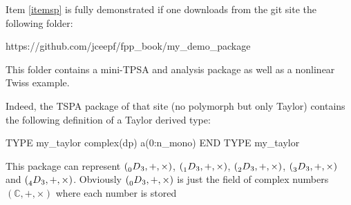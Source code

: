 \documentclass{hitec}     %
\begin{document}
Item \ref{itemsp} is fully demonstrated if one downloads from the git site the following folder:
\begin{code}
https://github.com/jceepf/fpp_book/my_demo_package
\end{code}
This folder contains a mini-TPSA and analysis package as well as a nonlinear Twiss example.


Indeed, the TSPA package of that site (no polymorph but only Taylor) contains the following definition of a Taylor derived type:


\begin{code}
 TYPE my_taylor             
    complex(dp) a(0:n_mono)    
END TYPE my_taylor
\end{code}

This package can represent  $(\prescript{}{0}{D}_{3},+,\times )$, $(\prescript{}{1}{D}_{3},+,\times )$, $(\prescript{}{2}{D}_{3},+,\times )$, $(\prescript{}{3}{D}_{3},+,\times )$ and $(\prescript{}{4}{D}_{3},+,\times )$. Obviously $(\prescript{}{0}{D}_{3},+,\times )$ is just the field of complex numbers $({\mathbb{C}},+,\times )$ where each number is stored \vn{my_taylor%

Moreover addition and subtraction  are defined respectively by overloading the Fortran90 intrinsic operators via the following functions:

\begin{code}
  FUNCTION add( S1, S2 )
    implicit none
    TYPE (my_taylor) add
    TYPE (my_taylor), INTENT (IN) :: S1, S2

     add%
     
     call clean(add)
  END FUNCTION add
  
  
  FUNCTION subs( S1, S2 )
    implicit none
    TYPE (my_taylor) subs
    TYPE (my_taylor), INTENT (IN) :: S1, S2

     subs%
     
     call clean(subs)
  END FUNCTION subs
  
  
 \end{code}

This is exactly \Eq{eq:nodnvpm}.  We encourage the reader to compile the files and run the main program. 


\section{DA and TPSA maps}\label{s:datpsamaps}

The code for this section is located at \vn{z_track_da_tpsa.f90}.

}
\end{document}
